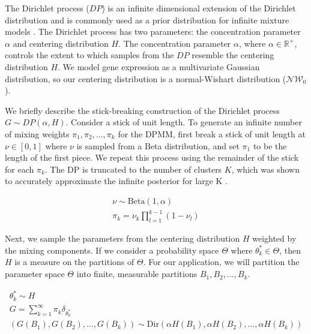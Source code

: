 \documentclass[10pt,letterpaper]{article}
\begin{document}
The Dirichlet process ($DP$) is an infinite dimensional extension of the Dirichlet distribution \cite{fergusonBayesianAnalysisNonparametric1973} and is commonly used as a prior distribution for infinite mixture models \cite{muller2004nonparametric, gorurDirichletProcessGaussian2010}. The Dirichlet process has two parameters: the concentration parameter $\alpha$ and centering distribution $H$. The concentration parameter $\alpha$, where $\alpha \in \mathbb{R}^+$, controls the extent to which samples from the $DP$ resemble the centering distribution $H$. We model gene expression as a multivariate Gaussian distribution, so our centering distribution is a normal-Wishart distribution ($\mathcal{NW}_0$).

We briefly describe the stick-breaking construction of the Dirichlet process $G \sim DP(\alpha, H)$. Consider a stick of unit length. To generate an infinite number of mixing weights $\pi_1, \pi_2, ..., \pi_k$ for the DPMM, first break a stick of unit length at $\nu \in [0, 1]$ where $\nu$ is sampled from a Beta distribution, and set $\pi_1$ to be the length of the first piece. We repeat this process using the remainder of the stick for each $\pi_k$. The DP is truncated to the number of clusters $K$, which was shown to accurately approximate the infinite posterior for large K \cite{hughes2013memoized, teh2010dirichlet, gelmanBayesianDataAnalysis2013, fergusonBayesianAnalysisNonparametric1973, mullerBayesianNonparametricData2015, phadia2015prior}.

\begin{gather}
\label{eq:dp}
\nu \sim \text{Beta}(1, \alpha) \\
\pi_k = \nu_k \prod_{l=1}^{k-1}(1 - \nu_l)
\end{gather}

Next, we sample the parameters from the centering distribution $H$ weighted by the mixing components. If we consider a probability space $\Theta$ where $\theta_k^{*} \in \Theta$, then $H$ is a measure on the partitions of $\Theta$. For our application, we will partition the parameter space $\Theta$ into finite, measurable partitions $B_1, B_2, ..., B_k$. 

\begin{gather}
\theta_k^{*} \sim H \\
G = \sum_{k=1}^{\infty} \pi_k \delta_{\theta_k^{*}} \\
(G(B_1), G(B_2), ..., G(B_k)) \sim \text{Dir}(\alpha H(B_1), \alpha H(B_2), ..., \alpha H(B_k)) 
\end{gather}
\end{document}
